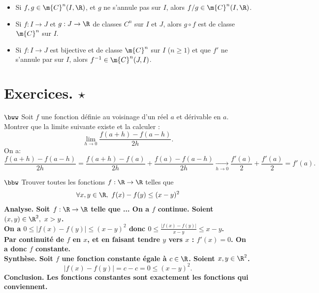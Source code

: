 \documentclass[11pt]{article}
\begin{document}
\begin{prop}{}{}
    \begin{itemize}
        \item Si $f,g\in\m{C}^n(I,\R)$, et $g$ ne s'annule pas sur $I$, alors $f/g\in\m{C}^n(I,\R)$.
        \item Si $f:I\to J$ et $g:J\to\R$ de classes $C^n$ sur $I$ et $J$, alors $g\circ f$ est de classe $\m{C}^n$ sur $I$.
        \item Si $f:I\to J$ est bijective et de classe $\m{C}^n$ sur $I$ ($n\geq1$) et que $f'$ ne s'annule par sur $I$, alors $f^{-1}\in\m{C}^n(J,I)$.
    \end{itemize}
\end{prop}

\section{Exercices. \texorpdfstring{$\star$}{Lg}}

\begin{exercice}{$\bww$}{}
    Soit $f$ une fonction définie au voisinage d'un réel $a$ et dérivable en $a$. Montrer que la limite suivante existe et la calculer :
    \begin{equation*}
        \lim_{h\to0}\frac{f(a+h)-f(a-h)}{2h}.
    \end{equation*}
    \tcblower
    On a:
    \begin{equation*}
        \frac{f(a+h)-f(a-h)}{2h}=\frac{f(a+h)-f(a)}{2h}+\frac{f(a)-f(a-h)}{2h}\xrightarrow[h\to0]{}\frac{f'(a)}{2}+\frac{f'(a)}{2}=f'(a).
    \end{equation*}
\end{exercice}

\begin{exercice}{$\bbw$}{}
    Trouver toutes les fonctions $f:\R\to\R$ telles que
    \begin{equation*}
        \forall x,y\in\R, ~ f(x)-f(y)\leq(x-y)^2
    \end{equation*}
    \tcblower
    \bf{Analyse.} Soit $f:\R\to\R$ telle que ... On a $f$ continue. Soient $(x,y)\in\R^2, ~ x>y$.\\
    On a $0\leq|f(x)-f(y)|\leq(x-y)^2$ donc $0\leq\frac{|f(x)-f(y)|}{x-y}\leq x-y$.\\
    Par continuité de $f$ en $x$, et en faisant tendre $y$ vers $x$ : $f'(x)=0$. On a donc $f$ constante.\\
    \bf{Synthèse.} Soit $f$ une fonction constante égale à $c\in\R$. Soient $x,y\in\R^2$.
    \begin{equation*}
        |f(x)-f(y)|=c-c=0\leq(x-y)^2.
    \end{equation*}
    \bf{Conclusion.} Les fonctions constantes sont exactement les fonctions qui conviennent.
\end{exercice}
\end{document}

